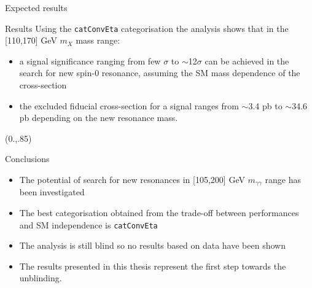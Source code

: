 \documentclass[10pt,UKenglish, leqno, xcolor = dvipsnames]{beamer}
\begin{document}
\begin{frame}{Expected results}
\begin{textblock}{1}
			\begin{figure}
			\end{figure}
		\end{textblock}
	\end{frame}

	\begin{frame}{Results}
		\vfill
		Using the \texttt{catConvEta} categorisation the analysis shows that in the [110,170] GeV $m_X$ mass range:
		\begin{itemize}
			\item a signal significance ranging from few $\sigma$ to $\sim$12$\sigma$ can be achieved in the search for new spin-0 resonance, assuming the SM mass dependence of the cross-section
			\item the excluded fiducial cross-section for a signal ranges from $\sim$3.4 pb to $\sim$34.6 pb depending on the new resonance mass.
		\end{itemize}
		\vfill
		\begin{textblock}{1}(0.,.85)
			\begin{figure}
			\end{figure}
		\end{textblock}
	\end{frame}

	\begin{frame}{Conclusions}
		\vfill
		\begin{itemize}
			\item The potential of search for new resonances in [105,200] GeV $m_{\gamma\gamma}$ range has been investigated
			\item The best categorisation obtained from the trade-off between performances and SM independence is \texttt{catConvEta}
			\item The analysis is still blind so no results based on data have been shown
			\item The results presented in this thesis represent the first step towards the unblinding.
		\end{itemize} 
		\vfill
	\end{frame}
\end{document}
